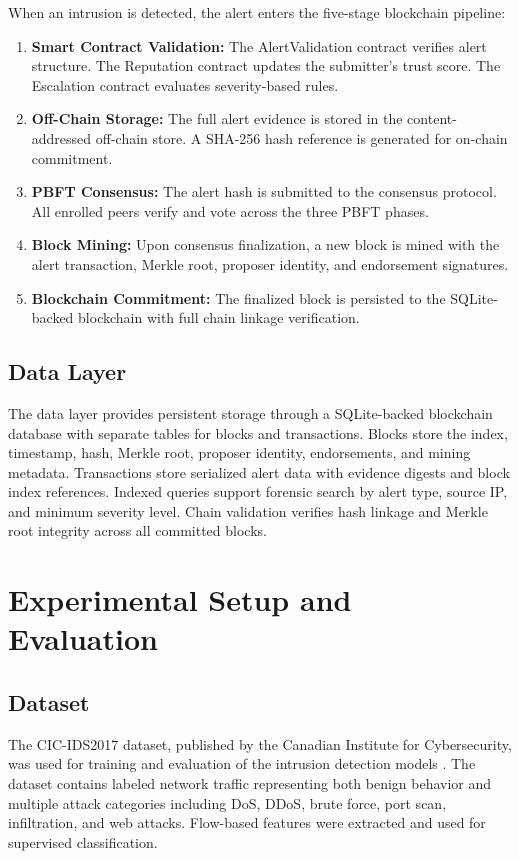 \documentclass[conference]{IEEEtran}
\begin{document}
When an intrusion is detected, the alert enters the five-stage blockchain pipeline:
\begin{enumerate}
    \item \textbf{Smart Contract Validation:} The AlertValidation contract verifies alert structure. The Reputation contract updates the submitter's trust score. The Escalation contract evaluates severity-based rules.
    \item \textbf{Off-Chain Storage:} The full alert evidence is stored in the content-addressed off-chain store. A SHA-256 hash reference is generated for on-chain commitment.
    \item \textbf{PBFT Consensus:} The alert hash is submitted to the consensus protocol. All enrolled peers verify and vote across the three PBFT phases.
    \item \textbf{Block Mining:} Upon consensus finalization, a new block is mined with the alert transaction, Merkle root, proposer identity, and endorsement signatures.
    \item \textbf{Blockchain Commitment:} The finalized block is persisted to the SQLite-backed blockchain with full chain linkage verification.
\end{enumerate}

\subsection{Data Layer}
The data layer provides persistent storage through a SQLite-backed blockchain database with separate tables for blocks and transactions. Blocks store the index, timestamp, hash, Merkle root, proposer identity, endorsements, and mining metadata. Transactions store serialized alert data with evidence digests and block index references. Indexed queries support forensic search by alert type, source IP, and minimum severity level. Chain validation verifies hash linkage and Merkle root integrity across all committed blocks.


\section{Experimental Setup and Evaluation}

\subsection{Dataset}
The CIC-IDS2017 dataset, published by the Canadian Institute for Cybersecurity, was used for training and evaluation of the intrusion detection models \cite{cic2017}. The dataset contains labeled network traffic representing both benign behavior and multiple attack categories including DoS, DDoS, brute force, port scan, infiltration, and web attacks. Flow-based features were extracted and used for supervised classification.
\end{document}
